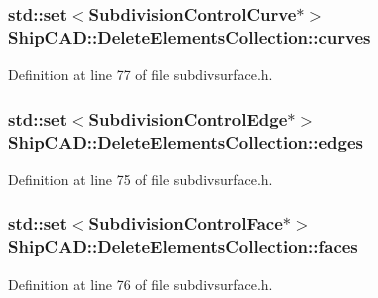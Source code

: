 \subsubsection[{\texorpdfstring{curves}{curves}}]{\setlength{\rightskip}{0pt plus 5cm}std\+::set$<${\bf Subdivision\+Control\+Curve}$\ast$$>$ Ship\+C\+A\+D\+::\+Delete\+Elements\+Collection\+::curves}\hypertarget{classShipCAD_1_1DeleteElementsCollection_a9d5c12e9ab17876c05a598419f79f5a4}{}\label{classShipCAD_1_1DeleteElementsCollection_a9d5c12e9ab17876c05a598419f79f5a4}


Definition at line 77 of file subdivsurface.\+h.

\subsubsection[{\texorpdfstring{edges}{edges}}]{\setlength{\rightskip}{0pt plus 5cm}std\+::set$<${\bf Subdivision\+Control\+Edge}$\ast$$>$ Ship\+C\+A\+D\+::\+Delete\+Elements\+Collection\+::edges}\hypertarget{classShipCAD_1_1DeleteElementsCollection_a43038e1787626cde31dcb023366d886d}{}\label{classShipCAD_1_1DeleteElementsCollection_a43038e1787626cde31dcb023366d886d}


Definition at line 75 of file subdivsurface.\+h.

\subsubsection[{\texorpdfstring{faces}{faces}}]{\setlength{\rightskip}{0pt plus 5cm}std\+::set$<${\bf Subdivision\+Control\+Face}$\ast$$>$ Ship\+C\+A\+D\+::\+Delete\+Elements\+Collection\+::faces}\hypertarget{classShipCAD_1_1DeleteElementsCollection_ad032ba30c3ca251e710d0cb02abeb3d2}{}\label{classShipCAD_1_1DeleteElementsCollection_ad032ba30c3ca251e710d0cb02abeb3d2}


Definition at line 76 of file subdivsurface.\+h.

